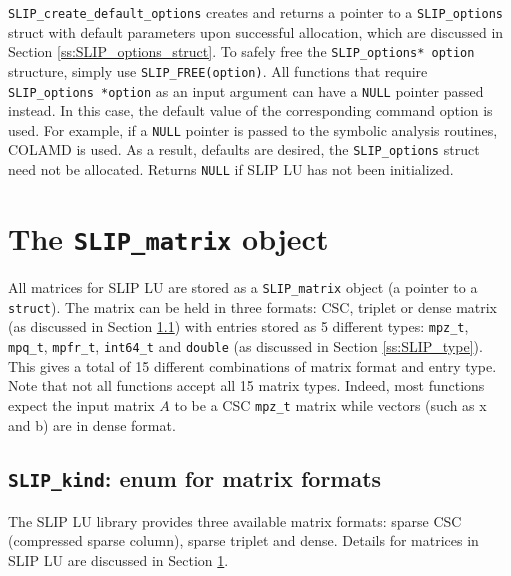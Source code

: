 \documentclass[12pt]{article}
\theoremstyle{definition}
\begin{document}
\verb|SLIP_create_default_options| creates and returns a pointer to a
\verb|SLIP_options| struct with default parameters upon successful allocation,
which are discussed in Section \ref{ss:SLIP_options_struct}.  To safely free
the \verb|SLIP_options* option| structure, simply use \verb|SLIP_FREE(option)|.
All functions that require \verb|SLIP_options *option| as an input argument can
have a \verb'NULL' pointer passed instead. In this case, the default value of
the corresponding command option is used. For example, if a \verb'NULL' pointer
is passed to the symbolic analysis routines, COLAMD is used. As a result,
defaults are desired, the \verb|SLIP_options| struct need not be allocated.
Returns \verb|NULL| if SLIP LU has not been initialized.

\cprotect\section{The \verb|SLIP_matrix| object} \label{ss:SLIP_matrix}

All matrices for SLIP LU are stored as a \verb|SLIP_matrix| object (a pointer
to a \verb'struct').  The matrix can be held in three formats: CSC, triplet or
dense matrix (as discussed in Section \ref{ss:SLIP_kind}) with entries stored
as 5 different types: \verb|mpz_t|, \verb|mpq_t|, \verb|mpfr_t|, \verb|int64_t|
and \verb|double| (as discussed in Section \ref{ss:SLIP_type}).  This gives a
total of 15 different combinations of matrix format and entry type. Note that
not all functions accept all 15 matrix types. Indeed, most functions expect the
input matrix $A$ to be a CSC \verb|mpz_t| matrix while vectors (such as x and
b) are in dense format.

\cprotect\subsection{\verb|SLIP_kind|: enum for matrix formats}
\label{ss:SLIP_kind}

The SLIP LU library provides three available matrix formats: sparse CSC
(compressed sparse column), sparse triplet and dense. Details for matrices in
SLIP LU are discussed in Section \ref{ss:SLIP_matrix}.
\end{document}
